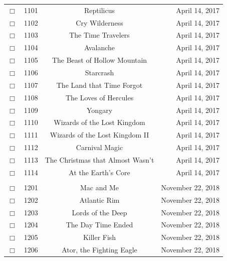 \documentclass[12pt]{article}
\begin{document}
\begin{center}
\begin{longtable}[c]{cccr}
\\  %
$\Box$&1101&Reptilicus&April 14, 2017\\
$\Box$&1102&Cry Wilderness&April 14, 2017\\
$\Box$&1103&The Time Travelers&April 14, 2017\\
$\Box$&1104&Avalanche&April 14, 2017\\
$\Box$&1105&The Beast of Hollow Mountain&April 14, 2017\\
$\Box$&1106&Starcrash&April 14, 2017\\
$\Box$&1107&The Land that Time Forgot&April 14, 2017\\
$\Box$&1108&The Loves of Hercules&April 14, 2017\\
$\Box$&1109&Yongary&April 14, 2017\\
$\Box$&1110&Wizards of the Lost Kingdom&April 14, 2017\\
$\Box$&1111&Wizards of the Lost Kingdom II&April 14, 2017\\
$\Box$&1112&Carnival Magic&April 14, 2017\\
$\Box$&1113&The Christmas that Almost Wasn't&April 14, 2017\\
$\Box$&1114&At the Earth's Core&April 14, 2017\\  %

\\  %
$\Box$&1201&Mac and Me&November 22, 2018\\
$\Box$&1202&Atlantic Rim&November 22, 2018\\
$\Box$&1203&Lords of the Deep&November 22, 2018\\
$\Box$&1204&The Day Time Ended&November 22, 2018\\
$\Box$&1205&Killer Fish&November 22, 2018\\
$\Box$&1206&Ator, the Fighting Eagle&November 22, 2018\\  %

\end{longtable}\end{center}
\end{document}
